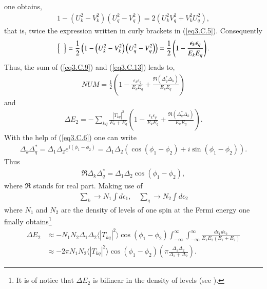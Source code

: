 one obtains,
\begin{align}
1-\left(U_k^2-V_k^2\right)\left(U_q^2-V_q^2\right)=2\left(U_k^2V_q^2+V_k^2U_q^2\right),
\end{align}
that is, twice the expression written in curly brackets in (\ref{eq3.C.5}). Consequently
\begin{align}\label{eq3.C.13}
\left\{\vphantom{\left(U_q^2-V_q^2\right)}\;\;\right\}=\frac{1}{2}\left(1-\left(U_k^2-V_k^2\right)\left(U_q^2-V_q^2\right)\right)=\frac{1}{2}\left(1-\frac{\epsilon_k\epsilon_q}{E_kE_q}\right).
\end{align}
Thus, the sum of (\ref{eq3.C.9}) and (\ref{eq3.C.13}) leads to,
\begin{align}
NUM=\frac{1}{2}\left(1-\frac{\epsilon_k\epsilon_q}{E_kE_q}+\frac{\Re(\Delta_q^*\Delta_k)}{E_kE_q}\right)
\end{align}
and
\begin{align}
\Delta E_2=-\sum_{kq}\frac{|T_{kq}|^2}{E_k+E_q}\left(1-\frac{\epsilon_k\epsilon_q}{E_kE_q}+\frac{\Re(\Delta_q^*\Delta_k)}{E_kE_q}\right).
\end{align}
With the help of (\ref{eq3.C.6}) one can write
\begin{align}
\Delta_k\Delta_q^*=\Delta_1\Delta_2e^{i(\phi_1-\phi_2)}=\Delta_1\Delta_2\left(\cos(\phi_1-\phi_2)+i\sin(\phi_1-\phi_2)\right).
\end{align}
Thus
\begin{align}
\Re\Delta_k\Delta_q^*=\Delta_1\Delta_2\cos(\phi_1-\phi_2),
\end{align}
where $\Re$ stands for real part. Making use of
\begin{align}
\sum_k\rightarrow N_1\int d\epsilon_1,\quad\sum_q\rightarrow N_2\int d\epsilon_2
\end{align}
where $N_1$ and $N_2$ are the density of levels of one spin at the Fermi energy one finally obtains\footnote{It is of notice that $\Delta E_2$ is bilinear in the density of levels (see \cite{Potel:17}).}
\begin{align}\label{eq3.6.19}
\nonumber\Delta E_2&\approx-N_1N_2\Delta_1 \Delta_2 \langle|T_{kq}|^2\rangle \cos(\phi_1-\phi_2)\int_{-\infty}^{\infty}\int_{-\infty}^{\infty}\frac{d\epsilon_1 d\epsilon_2}{E_1 E_2(E_1+E_2)}\\
&\approx -2\pi N_1 N_2 \langle|T_{kq}|^2\rangle \cos(\phi_1-\phi_2) \left(\pi\frac{\Delta_1\Delta_2}{\Delta_1+\Delta_2}\right).
\end{align}
